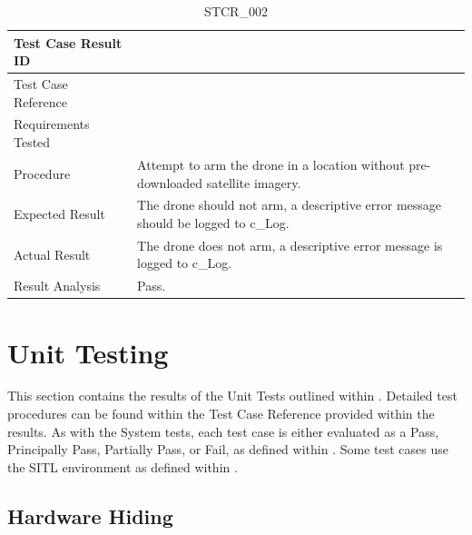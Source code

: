 \documentclass[12pt, titlepage]{article}
\begin{document}
\begin{table}[!h]
\begin{center}
\caption {STCR\_002}
\label{tab:STCR_002}
\begin{tabular}{ | m{3.2cm} | m{12.2cm} | } 
\hline
Test Case Result ID & \nameref{tab:STCR_023} \\ 
\hline
Test Case Reference & \nameref{tab:STC_023}  \\ 
\hline
Requirements Tested & \nameref{SR_001} \\ 
\hline
Procedure & Attempt to arm the drone in a location without pre-downloaded satellite imagery.  \\ 
\hline
Expected Result & The drone should not arm, a descriptive error message should be logged to c\_Log.    \\ 
\hline
Actual Result & The drone does not arm, a descriptive error message is logged to c\_Log.  \\ 
\hline
Result Analysis & Pass.  \\ 
\hline
\end{tabular}
\end{center}
\end{table}


\clearpage

\section{Unit Testing}
\label{sec:UnitTesting}

This section contains the results of the Unit Tests outlined within . Detailed test procedures can be found within the Test Case Reference provided within the results. As with the System tests, each test case is either evaluated as a Pass, Principally Pass, Partially Pass, or Fail, as defined within . Some test cases use the SITL environment as defined within .

\subsection{Hardware Hiding}
\label{subsec:hardwareHiding}
\end{document}
